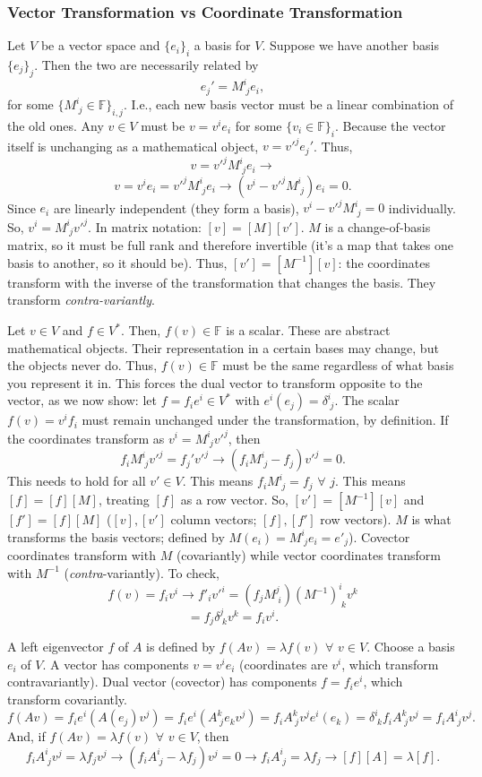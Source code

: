 \documentclass[11pt]{article}
\begin{document}
	\subsubsection*{Vector Transformation vs Coordinate Transformation}
	Let $V$ be a vector space and $\{e_i\}_i$ a basis for $V$. Suppose we have another basis $\{e_j\}_j$. Then the two are necessarily related by
	$$
	e_j' = M^i_{\; j}e_i,
	$$
	for some $\{M^i_{\; j}\in \mathbb{F}\}_{i,j}$. I.e., each new basis vector must be a linear combination of the old ones. Any $v\in V$ must be $v=v^i e_i$ for some $\{v_i \in \mathbb{F}\}_i$. Because the vector itself is unchanging as a mathematical object, $v=v'^{j}e_j'$. Thus,
	$$
	v = v'^jM^i_{\; j}e_i \rightarrow
	$$
	$$
	v=v^ie_i=v'^jM^{i}_{\; j}e_i\rightarrow (v^i-v'^j M^i_{\; j})e_i=0.
	$$
	Since $e_i$ are linearly independent (they form a basis), $v^i-v'^j M^i_{\; j}=0$ individually. So, $v^i= M^i_{\; j}v'^j$. In matrix notation: $[v] = [M][v']$. $M$ is a change-of-basis matrix, so it must be full rank and therefore invertible (it's a map that takes one basis to another, so it should be). Thus, $[v']=[M^{-1}] [v]$: the coordinates transform with the inverse of the transformation that changes the basis. They transform \textit{contra-variantly}.
	
	Let $v\in V$ and $f\in V^*$. Then, $f(v)\in \mathbb{F}$ is a scalar. These are abstract mathematical objects. Their representation in a certain bases may change, but the objects never do. Thus, $f(v)\in \mathbb{F}$ must be the same regardless of what basis you represent it in. This forces the dual vector to transform opposite to the vector, as we now show: let $f=f_i e^i \in V^*$ with $e^i(e_j)=\delta^i_{\; j}$. The scalar $f(v)= v^if_i$ must remain unchanged under the transformation, by definition. If the coordinates transform as $v^i = M^i_{\; j}v'^j$, then
	$$
	f_iM^i_{\; j}v'^j = f_j'v'^j\rightarrow (f_i M^i_{\; j}-f_j)v'^j = 0.
	$$
	This needs to hold for all $v'\in V$. This means $f_i M^i_{\; j}=f_j$ $\forall$ $j$. This means $[f] = [f][M]$, treating $[f]$ as a row vector. So, $[v'] = [M^{-1}][v]$ and $[f'] = [f][M]$ ($[v], [v']$ column vectors; $[f], [f']$ row vectors). $M$ is what transforms the basis vectors; defined by $M(e_i)=M^i_{\; j}e_i=e'_j$). Covector coordinates transform with $M$ (covariantly) while vector coordinates transform with $M^{-1}$ (\textit{contra}-variantly). To check,
	$$
	f(v) = f_i v^i \rightarrow f'_i v'^i = (f_j M^j_{\; i})(M^{-1})^i_{\; k}v^k
	$$ 
	$$
	= f_j \delta^j_{\; k} v^k = f_i v^i.
	$$
	
	A left eigenvector $f$ of $A$ is defined by $f(Av) = \lambda f(v)$ $\forall$ $v \in V$. Choose a basis $e_i$ of $V$. A vector has components $v=v^i e_i$ (coordinates are $v^i$, which transform contravariantly). Dual vector (covector) has components $f = f_i e^i$, which transform covariantly.
	$$
	f(Av) = f_i e^i(A(e_j)v^j)=f_ie^i(A^k_{\; j}e_k v^j) = f_i A^k_{\; j} v^j e^i(e_k) = \delta^i_{\; k}f_i A^k_{\; j} v^j = f_i A^i_{\; j} v^j.
	$$
	And, if $f(Av) = \lambda f(v)$ $\forall$ $v \in V$, then
	$$
	f_i A^i_{\; j} v^j = \lambda f_j v^j \rightarrow (f_i A^i_{\; j} - \lambda f_j)v^j = 0 \rightarrow f_i A^i_{\; j} = \lambda f_j \rightarrow [f][A]=\lambda [f].
	$$
	
\end{document}
